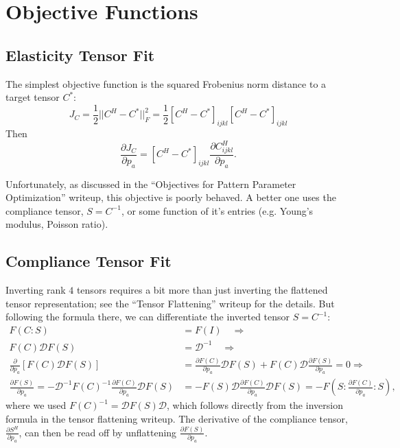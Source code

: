 \documentclass[10pt]{article}
\providecommand{\pder}[2]{\frac{\partial #1}{\partial #2}}
\begin{document}
\section{Objective Functions}
\subsection{Elasticity Tensor Fit}
The simplest objective function is the squared Frobenius norm distance to a
target tensor $C^*$:
$$
J_C = \frac{1}{2} ||C^H - C^*||^2_F = \frac{1}{2} \left[C^H - C^*\right]_{ijkl} \left[C^H - C^*\right]_{ijkl}
$$
Then
$$
\pder{J_C}{p_a} = \left[C^H - C^*\right]_{ijkl} \pder{C^H_{ijkl}}{p_a}.
$$

Unfortunately, as discussed in the ``Objectives for Pattern Parameter
Optimization'' writeup, this objective is poorly behaved. A better one uses
the compliance tensor, $S = C^{-1}$, or some function of it's entries (e.g. Young's
modulus, Poisson ratio).

\subsection{Compliance Tensor Fit}
Inverting rank $4$ tensors requires a bit more than just inverting the
flattened tensor representation; see the ``Tensor Flattening'' writeup for the
details. But following the formula there, we can differentiate the inverted
tensor $S = C^{-1}$:
\begin{align*}
    F(C : S) &= F(I) \quad \Longrightarrow \\
    F(C) \mathscr{D} F(S) &= \mathscr{D}^{-1} \quad \Longrightarrow \\
    \pder{}{p_a} \left[ F(C) \mathscr{D} F(S) \right] &= \pder{F(C)}{p_a} \mathscr{D} F(S) + F(C) \mathscr{D} \pder{F(S)}{p_a} = 0 \Longrightarrow \\
    \pder{F(S)}{p_a} = -\mathscr{D}^{-1} F(C)^{-1} \pder{F(C)}{p_a} \mathscr{D} F(S) &= -F(S)\mathscr{D} \pder{F(C)}{p_a} \mathscr{D} F(S) = -F\left(S : \pder{F(C)}{p_a} : S\right),
\end{align*}
where we used $F(C)^{-1} = \mathscr{D} F(S) \mathscr{D}$, which follows
directly from the inversion formula in the tensor flattening writeup. The
derivative of the compliance tensor, $\pder{S^H}{p_a}$, can then be read off by
unflattening $\pder{F(S)}{p_a}$.
\end{document}
